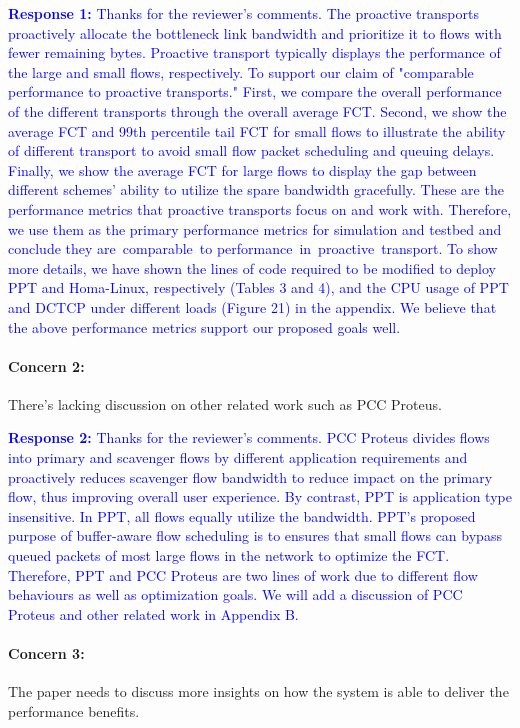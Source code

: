 \documentclass[12pt,one-column]{article}
\begin{document}
\noindent\textcolor{blue}{\textbf{Response 1:} 
Thanks for the reviewer's comments. 
The proactive transports proactively allocate the bottleneck link bandwidth and prioritize it to flows with fewer remaining bytes.
Proactive transport typically displays the performance of the large and small flows, respectively. 
To support our claim of "comparable performance to proactive transports."
First, we compare the overall performance of the different transports through the overall average FCT.
Second, we show the average FCT and 99th percentile tail FCT for small flows to illustrate the ability of different transport to avoid small flow packet scheduling and queuing delays.
Finally, we show the average FCT for large flows to display the gap between different schemes' ability to utilize the spare bandwidth gracefully.
These are the performance metrics that proactive transports focus on and work with.
Therefore, we use them as the primary performance metrics for simulation and testbed and conclude they are comparable to performance in proactive transport.
To show more details, we have shown the lines of code required to be modified to deploy PPT and Homa-Linux, respectively (Tables 3 and 4), and the CPU usage of PPT and DCTCP under different loads (Figure 21) in the appendix.
We believe that the above performance metrics support our proposed goals well.
  }

{\it \paragraph{Concern 2:} There's lacking discussion on other related work such as PCC Proteus.}



\noindent\textcolor{blue}{\textbf{Response 2:} 
Thanks for the reviewer’s comments. 
PCC Proteus divides flows into primary and scavenger flows by different application requirements and proactively reduces scavenger flow bandwidth to reduce impact on the primary flow, thus improving overall user experience.
By contrast, PPT is application type insensitive.
In PPT, all flows equally utilize the bandwidth.
PPT's proposed purpose of buffer-aware flow scheduling is to ensures that small flows can bypass queued packets of most large flows in the network to optimize the FCT.
Therefore, PPT and PCC Proteus are two lines of work due to different flow behaviours as well as optimization goals.
We will add a discussion of PCC Proteus and other related work in Appendix B.
}

{\it \paragraph{Concern 3:} The paper needs to discuss more insights on how the system is able to deliver the performance benefits.}
\end{document}
